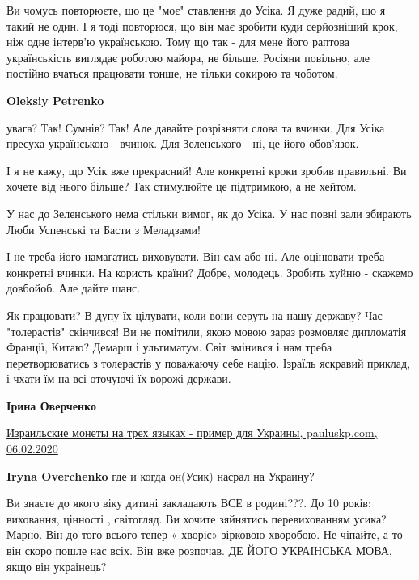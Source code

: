 \begin{itemize}
\begin{itemize}
Ви чомусь повторюєте, що це "моє" ставлення до Усіка. Я дуже радий, що я такий
не один. І я тоді повторюся, що він має зробити куди серйозніший крок, ніж одне
інтерв'ю українською. Тому що так - для мене його раптова українськість
виглядає роботою майора, не більше. Росіяни повільно, але постійно вчаться
працювати тонше, не тільки сокирою та чоботом.

\textbf{Oleksiy Petrenko} 

увага? Так! Сумнів? Так! Але давайте розрізняти слова та вчинки. Для Усіка
пресуха українською - вчинок. Для Зеленського - ні, це його обов’язок.

І я не кажу, що Усік вже прекрасний! Але конкретні кроки зробив правильні. Ви
хочете від нього більше? Так стимулюйте це підтримкою, а не хейтом.

У нас до Зеленського нема стільки вимог, як до Усіка. У нас повні зали збирають
Люби Успенські та Басти з Меладзами!

І не треба його намагатись виховувати. Він сам або ні. Але оцінювати треба
конкретні вчинки. На користь країни? Добре, молодець. Зробить хуйню - скажемо
довбойоб. Але дайте шанс.

\end{itemize} %


Як працювати? В дупу їх цілувати, коли вони серуть на нашу державу? Час
"толерастів" скінчився! Ви не помітили, якою мовою зараз розмовляє дипломатія
Франції, Китаю? Демарш і ультиматум. Світ змінився і нам треба перетворюватись
з толерастів у поважаючу себе націю. Ізраїль яскравий приклад, і чхати їм на
всі оточуючі їх ворожі держави.

\begin{itemize} %
\textbf{Ірина Оверченко} 

\href{http://pauluskp.com/news/93e64b6c4}{%
Израильские монеты на трех языках - пример для Украины, pauluskp.com, 06.02.2020%
}

\textbf{Iryna Overchenko} где и когда он(Усик) насрал на Украину?
\end{itemize} %


Ви знаєте до якого віку дитині закладають ВСЕ в родині???. До 10 років:
виховання, цінності , світогляд. Ви хочите зяйнятись перевихованням усика?
Марно. Він до того всього тепер « хворіє» зірковою хворобою. Не чіпайте, а то
він скоро пошле нас всіх. Він вже розпочав. ДЕ ЙОГО УКРАІНСЬКА МОВА, якщо він
украінець?


\end{itemize}
